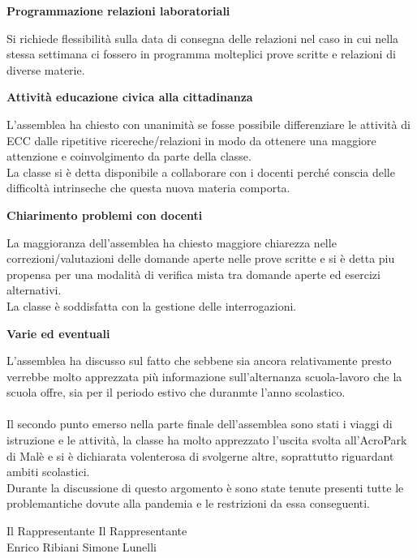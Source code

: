 \documentclass{article}
\begin{document}
\begin{flushleft}
\begin{center}
    \large \textbf{Programmazione relazioni laboratoriali}
\end{center}
Si richiede flessibilità sulla data di consegna delle relazioni nel caso in cui nella stessa settimana ci fossero in programma molteplici
prove scritte e relazioni di diverse materie.\\

\vspace{0.2 cm}

\begin{center}
    \large \textbf{Attività educazione civica alla cittadinanza}
\end{center}
L'assemblea ha chiesto con unanimità se fosse possibile differenziare le attività di ECC dalle ripetitive ricereche/relazioni 
in modo da ottenere una maggiore attenzione e coinvolgimento da parte della classe.\\
La classe si è detta disponibile a collaborare con i docenti perché conscia delle difficoltà intrinseche che questa nuova materia
comporta.\\
\vspace{0.2 cm}

\begin{center}
    \large \textbf{Chiarimento problemi con docenti }
\end{center}
La maggioranza dell'assemblea ha chiesto maggiore chiarezza nelle correzioni/valutazioni delle domande aperte nelle prove scritte
e si è detta piu propensa per una modalità di verifica mista tra domande aperte ed esercizi alternativi.\\
La classe è soddisfatta con la gestione delle interrogazioni.\\

\vspace{0.2 cm}

\begin{center}
    \large \textbf{Varie ed eventuali}
\end{center}
L'assemblea ha discusso sul fatto che sebbene sia ancora relativamente presto verrebbe molto apprezzata più informazione sull'alternanza
scuola-lavoro che la scuola offre, sia per il periodo estivo che duranmte l'anno scolastico.\\
\\
Il secondo punto emerso nella parte finale dell'assemblea sono stati i viaggi di istruzione e le attività, la classe ha molto 
apprezzato l'uscita svolta all'AcroPark di Malè e si è dichiarata volenterosa di svolgerne altre, soprattutto riguardant ambiti scolastici.\\
Durante la discussione di questo argomento è sono state tenute presenti tutte le problemantiche dovute alla pandemia e le restrizioni 
da essa conseguenti.\\
\end{flushleft}
\vspace{1cm}
\normalsize
Il Rappresentante \hspace{3cm} Il Rappresentante\\
Enrico Ribiani \hspace{3.4cm} Simone Lunelli\\
\end{document}
